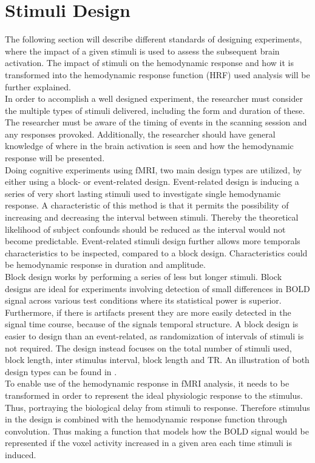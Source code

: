 \section{Stimuli Design} \label{sec:Stim}

The following section will describe different standards of designing experiments, where the impact of a given stimuli is used to assess the subsequent brain activation. The impact of stimuli on the hemodynamic response and how it is transformed into the hemodynamic response function (HRF) used analysis will be further explained. \\
In order to accomplish a well designed experiment, the researcher must consider the multiple types of stimuli delivered, including the form and duration of these. The researcher must be aware of the timing of events in the scanning session and any responses provoked. Additionally, the researcher should have general knowledge of where in the brain activation is seen and how the hemodynamic response will be presented. \cite{Moayedi2018} \\
Doing cognitive experiments using fMRI, two main design types are utilized, by either using a block- or event-related design. Event-related design is inducing a series of very short lasting stimuli used to investigate single hemodynamic response. A characteristic of this method is that it permits the possibility of increasing and decreasing the interval between stimuli. Thereby the theoretical likelihood of subject confounds should be reduced as the interval would not become predictable. Event-related stimuli design further allows more temporals characteristics to be inspected, compared to a block design. Characteristics could be hemodynamic response in duration and amplitude. \cite{Chee2003}  \\
Block design works by performing a series of less but longer stimuli. Block designs are ideal for experiments involving detection of small differences in BOLD signal across various test conditions where its statistical power is superior. Furthermore, if there is artifacts present they are more easily detected in the signal time course, because of the signals temporal structure. A block design is easier to design than an event-related, as randomization of intervals of stimuli is not required. The design instead focuses on the total number of stimuli used, block length, inter stimulus interval, block length and TR. An illustration of both design types can be found in . \cite{Chee2003}  \\     
To enable use of the hemodynamic response in fMRI analysis, it needs to be transformed in order to represent the ideal physiologic response to the stimulus. Thus, portraying the biological delay from stimuli to response. Therefore stimulus in the design is combined with the hemodynamic response function through convolution. Thus making a function that models how the BOLD signal would be represented if the voxel activity increased in a given area each time stimuli is induced. \cite{Moayedi2018}

